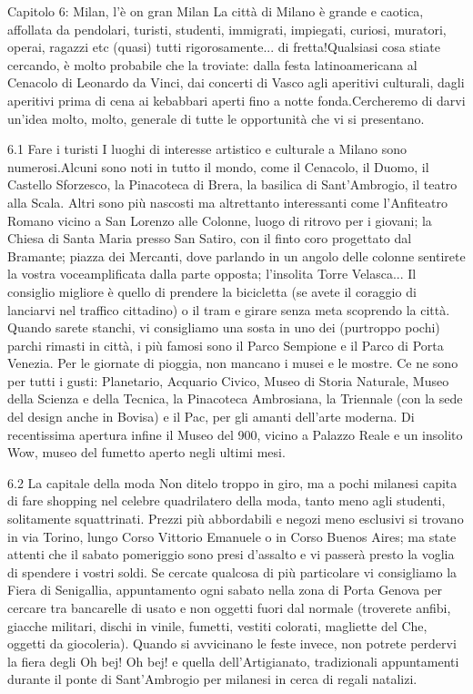 Capitolo 6: Milan, l’è on gran Milan
La città di Milano è grande e caotica, affollata da pendolari, turisti, studenti, immigrati, impiegati, curiosi, muratori, operai, ragazzi etc (quasi) tutti rigorosamente... di fretta!Qualsiasi cosa stiate cercando, è molto probabile che la troviate: dalla festa latinoamericana al Cenacolo di Leonardo da Vinci, dai concerti di Vasco agli aperitivi culturali, dagli aperitivi prima di cena ai kebabbari aperti fino a notte fonda.Cercheremo di darvi un'idea molto, molto, generale di tutte le opportunità che vi si presentano.

6.1 Fare i turisti
I luoghi di interesse artistico e culturale a Milano sono numerosi.Alcuni sono noti in tutto il mondo, come il Cenacolo, il Duomo, il Castello Sforzesco, la Pinacoteca di Brera, la basilica di Sant'Ambrogio, il teatro alla Scala. Altri sono più nascosti ma altrettanto interessanti come l'Anfiteatro Romano vicino a San Lorenzo alle Colonne, luogo di ritrovo per i giovani; la Chiesa di Santa Maria presso San Satiro, con il finto coro progettato dal Bramante; piazza dei Mercanti, dove parlando in un angolo delle colonne sentirete la vostra voceamplificata dalla parte opposta; l'insolita Torre Velasca...
Il consiglio migliore è quello di prendere la bicicletta (se avete il coraggio di lanciarvi nel traffico cittadino) o il tram e girare senza meta scoprendo la città. Quando sarete stanchi, vi consigliamo una sosta in uno dei (purtroppo pochi) parchi rimasti in città, i più famosi sono il Parco Sempione e il Parco di Porta Venezia. Per le giornate di pioggia, non mancano i musei e le mostre. Ce ne sono per tutti i gusti: Planetario, Acquario Civico, Museo di Storia Naturale, Museo della Scienza e della Tecnica, la Pinacoteca Ambrosiana, la Triennale (con la sede del design anche in Bovisa) e il Pac, per gli amanti dell'arte moderna. Di recentissima apertura infine il Museo del 900, vicino a Palazzo Reale e un insolito Wow, museo del fumetto aperto negli ultimi mesi.

6.2 La capitale della moda
Non ditelo troppo in giro, ma a pochi milanesi capita di fare shopping nel celebre quadrilatero della moda, tanto meno agli studenti, solitamente squattrinati. Prezzi più abbordabili e negozi meno esclusivi si trovano in via Torino, lungo Corso Vittorio Emanuele o in Corso Buenos Aires; ma state attenti che il sabato pomeriggio sono presi d'assalto e vi passerà presto la voglia di spendere i vostri soldi. Se cercate qualcosa di più particolare vi consigliamo la Fiera di Senigallia, appuntamento ogni sabato nella zona di Porta Genova per cercare tra bancarelle di usato e non oggetti fuori dal normale (troverete anfibi, giacche militari, dischi in vinile, fumetti, vestiti colorati, magliette del Che, oggetti da giocoleria).
Quando si avvicinano le feste invece, non potrete perdervi la fiera degli Oh bej! Oh bej! e quella dell'Artigianato, tradizionali appuntamenti durante il ponte di Sant'Ambrogio per milanesi in cerca di regali natalizi.

